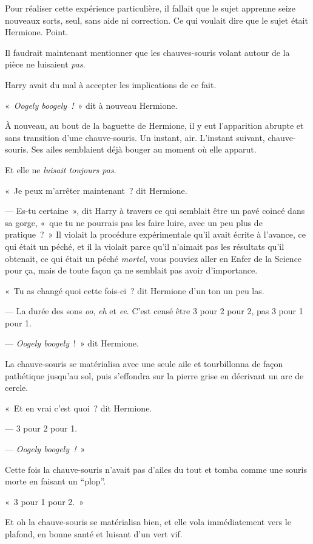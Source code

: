 Pour réaliser cette expérience particulière, il fallait que le sujet apprenne seize nouveaux sorts, seul, sans aide ni correction. Ce qui voulait dire que le sujet était Hermione. Point.

Il faudrait maintenant mentionner que les chauves-souris volant autour de la pièce ne luisaient \emph{pas}.

Harry avait du mal à accepter les implications de ce fait.

«~\emph{Oogely boogely~!}~» dit à nouveau Hermione.

À nouveau, au bout de la baguette de Hermione, il y eut l'apparition abrupte et sans transition d'une chauve-souris. Un instant, air. L'instant suivant, chauve-souris. Ses ailes semblaient déjà bouger au moment où elle apparut.

Et elle ne \emph{luisait toujours pas}.

«~Je peux m'arrêter maintenant~? dit Hermione.

--- Es-tu certaine~», dit Harry à travers ce qui semblait être un pavé coincé dans sa gorge, «~que tu ne pourrais pas les faire luire, avec un peu plus de pratique~?~» Il violait la procédure expérimentale qu'il avait écrite à l'avance, ce qui était un péché, et il la violait parce qu'il n'aimait pas les résultats qu'il obtenait, ce qui était un péché \emph{mortel}, vous pouviez aller en Enfer de la Science pour ça, mais de toute façon ça ne semblait pas avoir d'importance.

«~Tu as changé quoi cette fois-ci~? dit Hermione d'un ton un peu las.

--- La durée des sons \emph{oo}, \emph{eh} et \emph{ee}. C'est censé être 3 pour 2 pour 2, pas 3 pour 1 pour 1.

--- \emph{Oogely boogely}~!~» dit Hermione.

La chauve-souris se matérialisa avec une seule aile et tourbillonna de façon pathétique jusqu'au sol, puis s'effondra sur la pierre grise en décrivant un arc de cercle.

«~Et en vrai c'est quoi~? dit Hermione.

--- 3 pour 2 pour 1.

--- \emph{Oogely boogely~!}~»

Cette fois la chauve-souris n'avait pas d'ailes du tout et tomba comme une souris morte en faisant un “plop”.

«~3 pour 1 pour 2.~»

Et oh la chauve-souris se matérialisa bien, et elle vola immédiatement vers le plafond, en bonne santé et luisant d'un vert vif.

